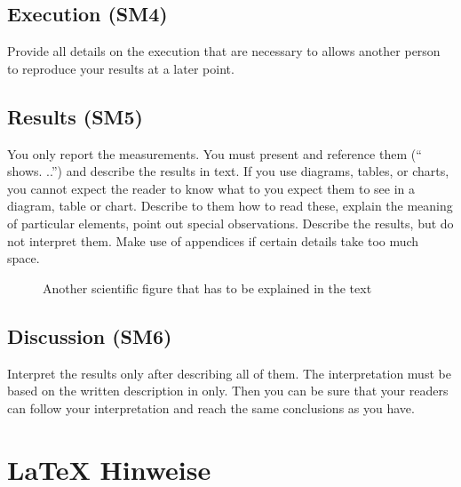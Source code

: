 \section{Execution (SM4)}\label{sec:evaluation:execution}

Provide all details on the execution that are necessary to allows another person to reproduce your results at a later point.

\section{Results (SM5)}\label{sec:evaluation:results}

You only report the measurements.
You must present and reference them (`` shows.
..'') and describe the results in text.
If you use diagrams, tables, or charts, you cannot expect the reader to know what to you expect them to see in a diagram, table or chart.
Describe to them how to read these, explain the meaning of particular elements, point out special observations.
Describe the results, but do not interpret them.
Make use of appendices if certain details take too much space.

\begin{figure}
  \centering
  \caption{Another scientific figure that has to be explained in the text}
  \label{fig:my_label2}
\end{figure}

\section{Discussion (SM6)}\label{sec:evaluation:discussion}

Interpret the results only after describing all of them.
The interpretation must be based on the written description in  only.
Then you can be sure that your readers can follow your interpretation and reach the same conclusions as you have.


\chapter{LaTeX Hinweise}
\label{sec:latexhints}

